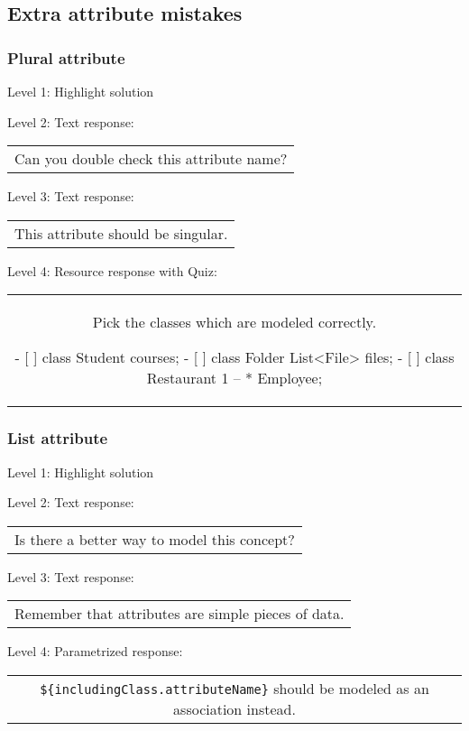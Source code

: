 \subsection{Extra attribute mistakes}

\subsubsection{Plural attribute}

\noindent Level 1: Highlight solution \medskip

\noindent Level 2: Text response: \medskip

\begin{tabular}{|c}
Can you double check this attribute name?
\end{tabular} \medskip

\noindent Level 3: Text response: \medskip

\begin{tabular}{|c}
This attribute should be singular.
\end{tabular} \medskip

\noindent Level 4: Resource response with Quiz:

\begin{tabular}{|c}
Pick the classes which are modeled correctly.

- [ ] class Student { courses; }
- [ ] class Folder { List<File> files; }
- [ ] class Restaurant { 1 -- * Employee; }
\end{tabular} \medskip


\subsubsection{List attribute}

\noindent Level 1: Highlight solution \medskip

\noindent Level 2: Text response: \medskip

\begin{tabular}{|c}
Is there a better way to model this concept?
\end{tabular} \medskip

\noindent Level 3: Text response: \medskip

\begin{tabular}{|c}
Remember that attributes are simple pieces of data.
\end{tabular} \medskip

\noindent Level 4: Parametrized response: \medskip

\begin{tabular}{|c}
\verb|${includingClass.attributeName}| should be modeled as an association instead.
\end{tabular} \medskip

